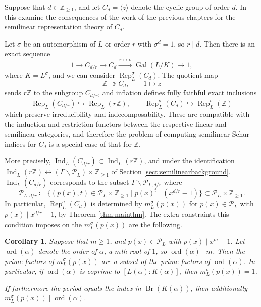 \documentclass[10pt, reqno, hidelinks]{amsart}
\DeclareMathOperator{\Gal}{Gal}
\DeclareMathOperator{\Br}{Br}
\DeclareMathOperator{\Rep}{Rep}
\DeclareMathOperator{\ord}{ord}
\DeclareMathOperator{\Ind}{Ind}
\newcommand{\bZ}{{\mathbb Z}}
\newcommand{\sP}{{\mathcal P}}
\numberwithin{thm}{subsection}
\newtheorem{cor}[thm]{Corollary}
\theoremstyle{definition}
\begin{document}
Suppose that $d \in \bZ_{\geq 1}$, and let $C_d = \langle z \rangle$ denote the cyclic group of order $d$. In this examine the consequences of the work of the previous chapters for the semilinear representation theory of $C_d$.

Let $\sigma$ be an automorphism of $L$ or order $r$ with $\sigma^d = 1$, so $r \mid d$. Then there is an exact sequence
\[
1 \rightarrow C_{d/r} \rightarrow C_d \xrightarrow{x \mapsto \sigma} \Gal(L / K) \rightarrow 1,
\]
where $K = L^{\sigma}$, and we can consider $\Rep_L^{\sigma}(C_d)$. The quotient map 
\[
\bZ \twoheadrightarrow C_d, \qquad 1 \mapsto z
\]
sends $r \bZ$ to the subgroup $C_{d/r}$, and inflation defines fully faithful exact inclusions
\[
\Rep_L(C_{d/r}) \hookrightarrow \Rep_L(r \bZ), \qquad \Rep_L^{\sigma}(C_d) \hookrightarrow \Rep_L^{\sigma}(\bZ)
\]
which preserve irreducibility and indecomposability. These are compatible with the induction and restriction functors between the respective linear and semilinear categories, and therefore the problem of computing semilinear Schur indices for $C_d$ is a special case of that for $\bZ$. 

More precisely, $\Ind_L(C_{d/r}) \subset \Ind_L(r \bZ)$, and under the identification $\Ind_L(r \bZ) \leftrightarrow (\Gamma \backslash \sP_L) \times \bZ_{\geq 1}$ of Section \ref{sect:semilinearbackground}, $\Ind_L(C_{d/r})$ corresponds to the subset $\Gamma \backslash \sP_{L, {d/r}}$ where
\[
\sP_{L, {d/r}} \coloneqq\{ (p(x),t) \in \sP_L \times \bZ_{\geq 1} \mid p(x)^t \mid (x^{d/r} - 1)\} \subset \sP_L \times \bZ_{\geq 1}.
\]
In particular, $\Rep_L^{\sigma}(C_d)$ is determined by $m_L^{\sigma}(p(x))$ for $p(x) \in \sP_L$ with $p(x) \mid x^{d/r} - 1$, by Theorem \ref{thm:mainthm}. The extra constraints this condition imposes on the $m_L^{\sigma}(p(x))$ are the following.

\begin{cor}\label{cor:mpxcyclicgroups}
	Suppose that $m \geq 1$, and $p(x) \in \sP_L$ with $p(x) \mid x^m - 1$. Let $\ord(\alpha)$ denote the order of $\alpha$, a $m$th root of $1$, so $\ord(\alpha) \mid m$. Then the prime factors of $m_L^{\sigma}(p(x))$ are a subset of the prime factors of $\ord(\alpha)$. In particular, if $\ord(\alpha)$ is coprime to $[L(\alpha) : K(\alpha)]$, then $m_L^{\sigma}(p(x)) = 1$. 
	
	If furthermore the period equals the index in $\Br(K(\alpha))$, then additionally $m_L^{\sigma}(p(x)) \mid \ord(\alpha)$.
\end{cor}
\end{document}
